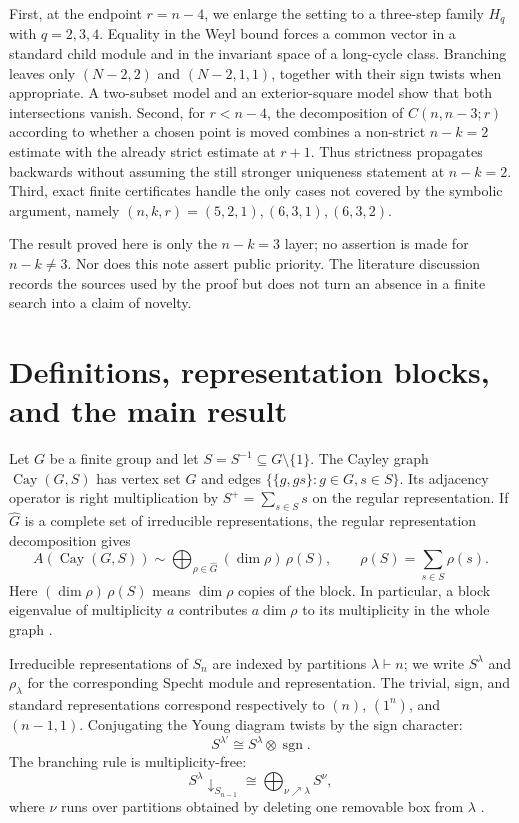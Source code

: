 \documentclass[11pt]{article}
\theoremstyle{definition}
\newcommand{\Cay}{\operatorname{Cay}}
\begin{document}
First, at the endpoint $r=n-4$, we enlarge the setting to a three-step family
$H_q$ with $q=2,3,4$.  Equality in the Weyl bound forces a common vector in a
standard child module and in the invariant space of a long-cycle class.
Branching leaves only $(N-2,2)$ and $(N-2,1,1)$, together with their sign
twists when appropriate.  A two-subset model and an exterior-square model
show that both intersections vanish.  Second, for $r<n-4$, the decomposition
of $C(n,n-3;r)$ according to whether a chosen point is moved combines a
non-strict $n-k=2$ estimate with the already strict estimate at $r+1$.
Thus strictness propagates backwards without assuming the still stronger
uniqueness statement at $n-k=2$.  Third, exact finite certificates handle
the only cases not covered by the symbolic argument, namely
$(n,k,r)=(5,2,1),(6,3,1),(6,3,2)$.

The result proved here is only the $n-k=3$ layer; no assertion is made for
$n-k\neq3$.  Nor does this note assert public priority.  The
literature discussion records the sources used by the proof but does not
turn an absence in a finite search into a claim of novelty.

\section{Definitions, representation blocks, and the main result}

Let $G$ be a finite group and let $S=S^{-1}\subseteq G\setminus\{1\}$.
The Cayley graph $\Cay(G,S)$ has vertex set $G$ and edges
$\{\{g,gs\}:g\in G,s\in S\}$.  Its adjacency operator is right
multiplication by $S^+=\sum_{s\in S}s$ on the regular representation.
If $\widehat G$ is a complete set of irreducible representations, the regular
representation decomposition gives
\[
 A(\Cay(G,S))\sim
 \bigoplus_{\rho\in\widehat G}(\dim\rho)\,\rho(S),
 \qquad
 \rho(S)=\sum_{s\in S}\rho(s).
 \tag{2.1}
\]
Here $(\dim\rho)\,\rho(S)$ means $\dim\rho$ copies of the block.  In
particular, a block eigenvalue of multiplicity $a$ contributes
$a\dim\rho$ to its multiplicity in the whole graph
\cite[Proposition~2.1]{LiXiaZhou2026}.

Irreducible representations of $S_n$ are indexed by partitions
$\lambda\vdash n$; we write $S^\lambda$ and $\rho_\lambda$ for the
corresponding Specht module and representation.  The trivial, sign, and
standard representations correspond respectively to
$(n)$, $(1^n)$, and $(n-1,1)$.  Conjugating the Young diagram twists by the
sign character:
\[
 S^{\lambda'}\cong S^\lambda\otimes\operatorname{sgn}.
 \tag{2.2}
\]
The branching rule is multiplicity-free:
\[
 S^\lambda\!\downarrow_{S_{n-1}}
 \cong\bigoplus_{\nu\nearrow\lambda}S^\nu,
 \tag{2.3}
\]
where $\nu$ runs over partitions obtained by deleting one removable box from
$\lambda$ \cite[Theorem~2.5]{LiXiaZhou2026}.
\end{document}
